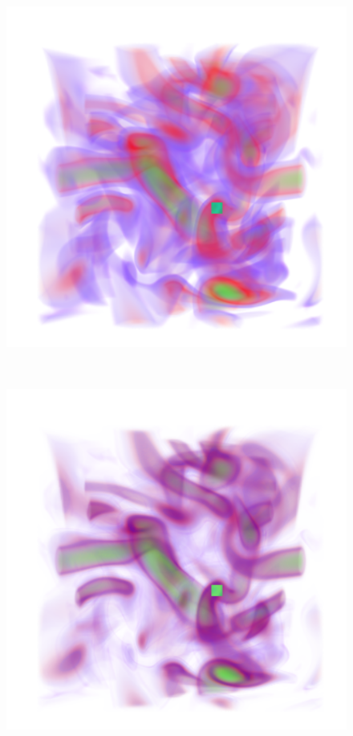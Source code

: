 \documentclass[twoside,twocolumn,10pt]{article}
\begin{document}
\begin{figure}
	\centering
	\begin{minipage}{.14\textwidth}
		\centering
		\includegraphics[width=1\linewidth]{vortex_crop}
		\label{fig:vortex}
	\end{minipage}~
	\begin{minipage}{.14\textwidth}
		\centering
		\includegraphics[width=1\linewidth]{vortex_blue_crop}

\end{minipage}
\end{figure}
\end{document}
